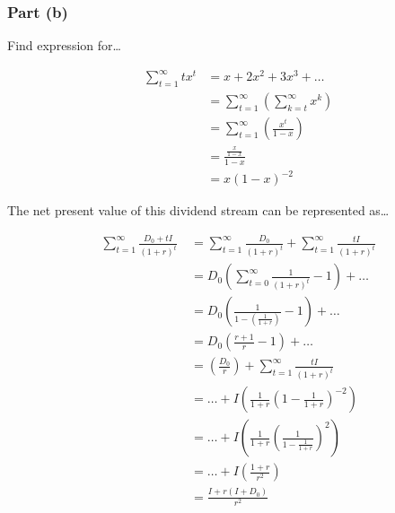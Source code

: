 \documentclass[11pt]{article}
\begin{document}
\subsubsection*{Part (b)}

Find expression for\dots

\setcounter{equation}{0}
\begin{eqnarray}
  & \sum_{t=1}^{\infty} tx^{t} &= x + 2x^{2} + 3x^{3} + \dots \\
                               &&= \sum_{t=1}^{\infty} \left( \sum_{k=t}^{\infty} x^{k} \right) \\
                               &&= \sum_{t=1}^{\infty} \left( \frac{x^{t}}{1 - x} \right) \\
                               &&= \frac{\frac{x}{1 - x}}{1 - x} \\
                               &&= x\left(1 - x\right)^{-2}
\end{eqnarray}

The net present value of this dividend stream can be represented as\dots

\begin{eqnarray}
  & \sum_{t=1}^{\infty} \frac{D_{0} + tI}{\left(1 + r\right)^{t}} \
  &= \sum_{t=1}^{\infty} \frac{D_{0}}{\left(1+r\right)^{t}} + \sum_{t=1}^{\infty} \frac{tI}{\left(1+r\right)^{t}} \\
  &&= D_{0}\left( \sum_{t=0}^{\infty} \frac{1}{\left(1+r\right)^{t}} - 1 \right) + \dots \\
  &&= D_{0}\left( \frac{1}{1 - \left(\frac{1}{1+r}\right)} -1 \right) + \dots \\
  &&= D_{0}\left( \frac{r+1}{r} -1 \right) + \dots \\
  &&= \left( \frac{D_{0}}{r} \right) + \sum_{t=1}^{\infty} \frac{tI}{\left(1+r\right)^{t}} \\
  &&= \dots + I\left( \frac{1}{1+r} \left(1 - \frac{1}{1+r}\right)^{-2} \right) \\
  &&= \dots + I\left( \frac{1}{1+r} \left( \frac{1}{1 - \frac{1}{1+r}} \right)^{2} \right) \\
  &&= \dots + I\left( \frac{1+r}{r^{2}} \right) \\
  &&= \frac{I + r\left(I + D_{0}\right)}{r^{2}}
\end{eqnarray}

\newpage

\end{document}
